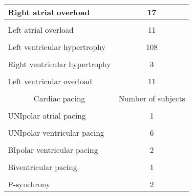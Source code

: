 \documentclass[submitted]{ieeeaccess}
\begin{document}
\begin{table}
\begin{adjustbox}{width=1\linewidth}
\begin{tabular}{|l|c|}
			Right atrial overload & 17 \\
			\hline
			&\\[-1em]
			Left atrial overload & 11 \\
			\hline
			&\\[-1em]
			Left ventricular hypertrophy & 108 \\
			\hline
			&\\[-1em]
			Right ventricular hypertrophy & 3 \\
			\hline
			&\\[-1em]
			Left ventricular overload & 11 \\
			\hline
			&\\[-1em]
			\multicolumn{1}{c|}{Cardiac pacing} &{Number of subjects} \\
			\hline
			&\\[-1em]
			UNIpolar atrial pacing & 1 \\
			\hline
			&\\[-1em]
			UNIpolar ventricular pacing & 6 \\
			\hline
			&\\[-1em]
			BIpolar ventricular pacing & 2 \\
			\hline
			&\\[-1em]
			Biventricular pacing & 1 \\
			\hline
			&\\[-1em]
			P-synchrony & 2 \\
			\hline
		\end{tabular}
		\label{table4}
        \end{adjustbox}
\end{table}
\end{document}
